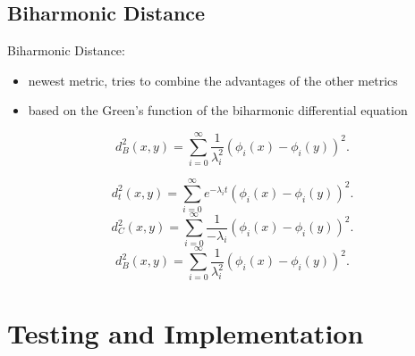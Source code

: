 \documentclass[]{beamer}
\begin{document}
\subsection{Biharmonic Distance}
	\begin{frame}
		Biharmonic Distance:\\
		\begin{itemize}
			\item newest metric, tries to combine the advantages of the other metrics
			\item based on the Green's function of the biharmonic differential equation
		\end{itemize}
		$$ d_B^2(x,y) = \sum_{i=0}^{\infty}  \frac{1}{\lambda_i^2}(\phi_i(x) - \phi_i(y))^2. $$

	\end{frame}

	\begin{frame}
		$$ d_t^2(x,y) = \sum_{i=0}^{\infty} e^{-\lambda_i t} (\phi_i(x) - \phi_i(y))^2. $$
		$$ d_C^2(x,y) = \sum_{i=0}^{\infty}  \frac{1}{-\lambda_i}(\phi_i(x) - \phi_i(y))^2. $$
		$$ d_B^2(x,y) = \sum_{i=0}^{\infty}  \frac{1}{\lambda_i^2}(\phi_i(x) - \phi_i(y))^2. $$
	\end{frame}

\section{Testing and Implementation}
\end{document}
